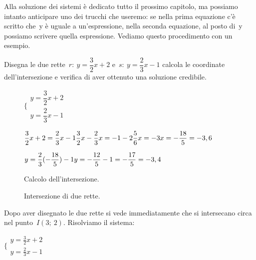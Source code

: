 \begin{exrig}
Alla soluzione dei sistemi è dedicato tutto il prossimo capitolo, ma possiamo 
intanto anticipare uno dei trucchi che useremo: se nella prima equazione c'è 
scritto che~y è uguale a un'espressione, nella seconda equazione, al posto 
di~y possiamo scrivere quella espressione. Vediamo questo procedimento con un 
esempio.

 \begin{esempio}
  Disegna le due rette~\(r:~y = \dfrac{3}{2} x +2\) e~\(s:~y = \dfrac{2}{3} x -1\) 
  calcola le coordinate dell'intersezione e verifica di aver
  ottenuto una soluzione credibile.
\begin{inaccessibleblock}
 \begin{figure}[h]
 \centering
 \begin{minipage}[]{.60\textwidth}
   \(\bigg \{
     \begin{array}{l}
      y = \dfrac{3}{2} x +2 \\
      y = \dfrac{2}{3} x -1
     \end{array}
   \)
  
   \(\dfrac{3}{2} x +2 = \dfrac{2}{3} x -1 \newline
    \dfrac{3}{2} x - \dfrac{2}{3} x = -1 -2 \newline
    \dfrac{5}{6} x = -3 \newline
    x = -\dfrac{18}{5} = -3,6\)
   
   \(y = \dfrac{2}{3} (-\dfrac{18}{5}) -1 \newline
    y = - \dfrac{12}{5} -1 = - \dfrac{17}{5} = -3,4\)
  \caption{Calcolo dell'intersezione.}\label{fig:elementi}
 \end{minipage}
 \begin{minipage}[]{.30\textwidth}
   \centering
  \caption{Intersezione di due rette.}\label{fig:intersezione02}
 \end{minipage}
\end{figure}
\end{inaccessibleblock}
 \end{esempio}
 
\vspace{-12pt}

   Dopo aver disegnato le due rette si vede immediatamente che si intersecano 
   circa nel punto~\(I(3;~2)\). Risolviamo il sistema:
   
   \(\bigg \{
     \begin{array}{l}
      y = \frac{3}{2} x +2 \\
      y = \frac{2}{3} x -1
     \end{array}
   \)
  

\end{exrig}
